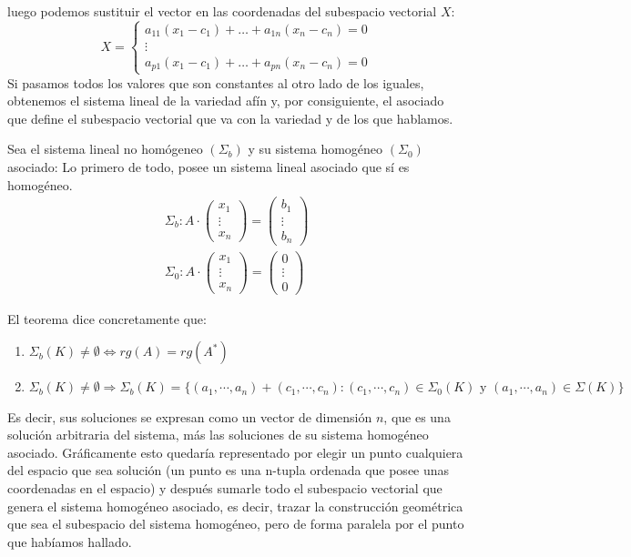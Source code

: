\documentclass[10pt,a4paper,openright]{book}
\theoremstyle{break}
\begin{document}
luego podemos sustituir el vector en las coordenadas del subespacio vectorial $X$:
$$X =\begin{cases} a_{11} (x_1 - c_1) + \ldots + a_{1n} (x_n - c_n) = 0 \\ \vdots \\  a_{p1} (x_1 - c_1) + \ldots + a_{pn} (x_n - c_n) = 0 \end{cases}$$
Si pasamos todos los valores que son constantes al otro lado de los iguales, obtenemos el sistema lineal de la variedad afín y, por consiguiente, el asociado que define el subespacio vectorial que va con la variedad y de los que hablamos.


Sea el sistema lineal no homógeneo $(\Sigma_b)$ y su sistema homogéneo $(\Sigma_0)$ asociado:
Lo primero de todo, posee un sistema lineal asociado que sí es homogéneo.
\begin{gather*}
\Sigma_b: A\cdot \begin{pmatrix}
x_1 \\ \vdots \\ x_n
\end{pmatrix}=\begin{pmatrix}
b_1 \\ \vdots \\ b_n
\end{pmatrix} \\
\Sigma_0: A\cdot \begin{pmatrix}
x_1 \\ \vdots \\ x_n
\end{pmatrix}=\begin{pmatrix}
0 \\ \vdots \\ 0
\end{pmatrix} 
\end{gather*}

El teorema dice concretamente que:
\begin{enumerate}
\item $\Sigma_b(K)\neq \emptyset\Leftrightarrow rg(A)=rg(A^*) $
\item $\Sigma_b(K)\neq \emptyset\Rightarrow \Sigma_b(K)=\{(a_1, \cdots, a_n)+(c_1, \cdots, c_n): (c_1,\cdots ,c_n)\in \Sigma_0(K) \mbox{ y }(a_1,\cdots,a_n)\in \Sigma(K)\}$
\end{enumerate}
Es decir, sus soluciones se expresan como un vector de dimensión $n$, que es una solución arbitraria del sistema, más las soluciones de su sistema homogéneo asociado.
Gráficamente esto quedaría representado por elegir un punto cualquiera del espacio que sea solución (un punto es una n-tupla ordenada que posee unas coordenadas en el espacio) y después sumarle todo el subespacio vectorial que genera el sistema homogéneo asociado, es decir, trazar la construcción geométrica que sea el subespacio del sistema homogéneo, pero de forma paralela por el punto que habíamos hallado.
\end{document}
